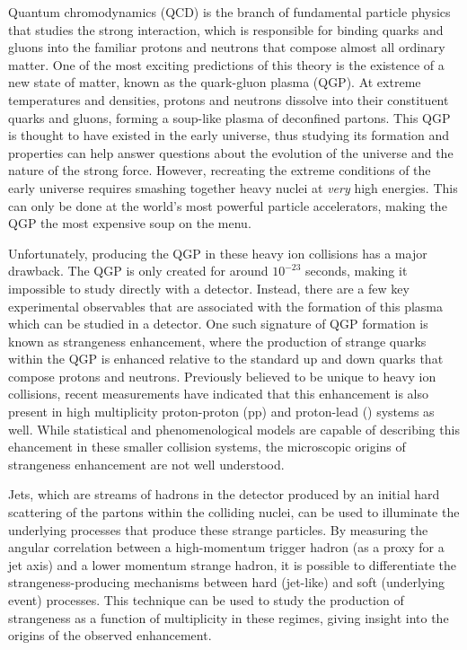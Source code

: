 Quantum chromodynamics (QCD) is the branch of fundamental particle physics that studies the strong interaction, which is responsible for binding quarks and gluons into the familiar protons and neutrons that compose almost all ordinary matter. One of the most exciting predictions of this theory is the existence of a new state of matter, known as the quark-gluon plasma (QGP). At extreme temperatures and densities, protons and neutrons dissolve into their constituent quarks and gluons, forming a soup-like plasma of deconfined partons. This QGP is thought to have existed in the early universe, thus studying its formation and properties can help answer questions about the evolution of the universe and the nature of the strong force. However, recreating the extreme conditions of the early universe requires smashing together heavy nuclei at \textit{very} high energies. This can only be done at the world's most powerful particle accelerators, making the QGP the most expensive soup on the menu.

Unfortunately, producing the QGP in these heavy ion collisions has a major drawback. The QGP is only created for around $10^{-23}$ seconds, making it impossible to study directly with a detector. Instead, there are a few key experimental observables that are associated with the formation of this plasma which can be studied in a detector. One such signature of QGP formation is known as strangeness enhancement, where the production of strange quarks within the QGP is enhanced relative to the standard up and down quarks that compose protons and neutrons. Previously believed to be unique to heavy ion collisions, recent measurements have indicated that this enhancement is also present in high multiplicity proton-proton (pp) and proton-lead (\pPb) systems as well. While statistical and phenomenological models are capable of describing this ehancement in these smaller collision systems, the microscopic origins of strangeness enhancement are not well understood.

Jets, which are streams of hadrons in the detector produced by an initial hard scattering of the partons within the colliding nuclei, can be used to illuminate the underlying processes that produce these strange particles. By measuring the angular correlation between a high-momentum trigger hadron (as a proxy for a jet axis) and a lower momentum strange hadron, it is possible to differentiate the strangeness-producing mechanisms between hard (jet-like) and soft (underlying event) processes. This technique can be used to study the production of strangeness as a function of multiplicity in these regimes, giving insight into the origins of the observed enhancement. 

